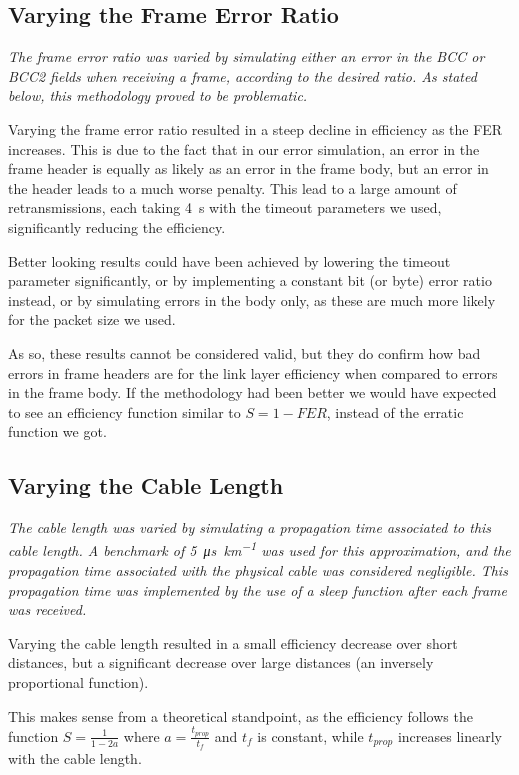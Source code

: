 \documentclass[11pt,a4paper,twocolumn]{article}
\begin{document}
\subsection{Varying the Frame Error Ratio}

\textit{The frame error ratio was varied by simulating either an error in the BCC or BCC2 fields when receiving a frame, according to the desired ratio. As stated below, this methodology proved to be problematic.}

Varying the frame error ratio resulted in a steep decline in efficiency as the FER increases.
This is due to the fact that in our error simulation, an error in the frame header is equally as likely as an error in the frame body, but an error in the header leads to a much worse penalty.
This lead to a large amount of retransmissions, each taking \qty{4}{\second} with the timeout parameters we used, significantly reducing the efficiency.

Better looking results could have been achieved by lowering the timeout parameter significantly, or by implementing a constant bit (or byte) error ratio instead, or by simulating errors in the body only, as these are much more likely for the packet size we used.

As so, these results cannot be considered valid, but they do confirm how bad errors in frame headers are for the link layer efficiency when compared to errors in the frame body.
If the methodology had been better we would have expected to see an efficiency function similar to $S = 1 - FER$, instead of the erratic function we got.

\subsection{Varying the Cable Length}

\textit{The cable length was varied by simulating a propagation time associated to this cable length. A benchmark of \qty[per-mode=symbol]{5}{\micro\second\per\kilo\metre} was used for this approximation, and the propagation time associated with the physical cable was considered negligible. This propagation time was implemented by the use of a sleep function after each frame was received.}

Varying the cable length resulted in a small efficiency decrease over short distances, but a significant decrease over large distances (an inversely proportional function).

This makes sense from a theoretical standpoint, as the efficiency follows the function $S = \frac{1}{1 - 2a}$ where $a = \frac{t_{prop}}{t_f}$ and $t_f$ is constant, while $t_{prop}$ increases linearly with the cable length.
\end{document}
